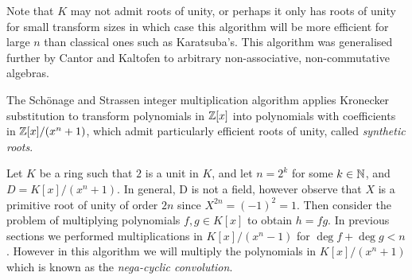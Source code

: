 Note that $K$ may not admit roots of unity, or perhaps it only has roots of unity for small transform sizes in which case this algorithm will be more efficient for large $n$ than classical ones such as Karatsuba's. This algorithm was generalised further by Cantor and Kaltofen to arbitrary non-associative, non-commutative algebras\cite{cantor-kaltofen}.

The Sch\"{o}nage and Strassen integer multiplication algorithm applies Kronecker substitution to transform polynomials in ${\mathbb Z}[x]$ into polynomials with coefficients in ${\mathbb Z}[x]/(x^n + 1)$, which admit particularly efficient roots of unity, called \emph{synthetic roots}.


Let $K$ be a ring such that $2$ is a unit in $K$, and let $n = 2^k$ for some $k \in {\mathbb N}$, and $D = K[x] / (x^n + 1)$. In general, D is not a field, however observe that $X$ is a primitive root of unity of order $2n$ since $X^{2n} = (-1)^2 = 1$. Then consider the problem of multiplying polynomials $f, g \in K[x]$ to obtain $h = fg$. In previous sections we performed multiplications in $K[x]/(x^n - 1)$ for $\deg f + \deg g < n$. However in this algorithm we will multiply the polynomials in $K[x]/(x^n + 1)$ which is known as the \textit{nega-cyclic convolution}. 

